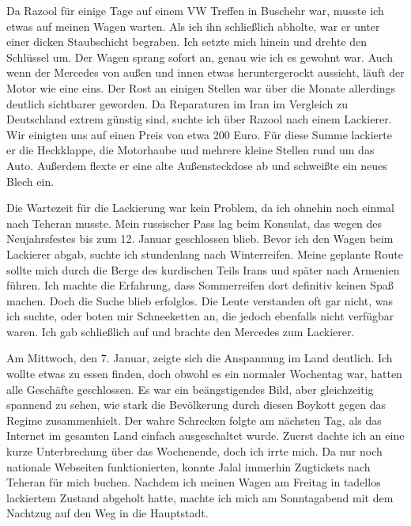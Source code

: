 Da Razool für einige Tage auf einem VW Treffen in Buschehr war, musste ich etwas auf meinen Wagen warten. Als ich ihn schließlich abholte, war er unter einer dicken Staubschicht begraben. Ich setzte mich hinein und drehte den Schlüssel um. Der Wagen sprang sofort an, genau wie ich es gewohnt war. Auch wenn der Mercedes von außen und innen etwas heruntergerockt aussieht, läuft der Motor wie eine eins. Der Rost an einigen Stellen war über die Monate allerdings deutlich sichtbarer geworden. Da Reparaturen im Iran im Vergleich zu Deutschland extrem günstig sind, suchte ich über Razool nach einem Lackierer. Wir einigten uns auf einen Preis von etwa 200 Euro. Für diese Summe lackierte er die Heckklappe, die Motorhaube und mehrere kleine Stellen rund um das Auto. Außerdem flexte er eine alte Außensteckdose ab und schweißte ein neues Blech ein.

Die Wartezeit für die Lackierung war kein Problem, da ich ohnehin noch einmal nach Teheran musste. Mein russischer Pass lag beim Konsulat, das wegen des Neujahrsfestes bis zum 12. Januar geschlossen blieb. Bevor ich den Wagen beim Lackierer abgab, suchte ich stundenlang nach Winterreifen. Meine geplante Route sollte mich durch die Berge des kurdischen Teils Irans und später nach Armenien führen. Ich machte die Erfahrung, dass Sommerreifen dort definitiv keinen Spaß machen. Doch die Suche blieb erfolglos. Die Leute verstanden oft gar nicht, was ich suchte, oder boten mir Schneeketten an, die jedoch ebenfalls nicht verfügbar waren. Ich gab schließlich auf und brachte den Mercedes zum Lackierer.

Am Mittwoch, den 7. Januar, zeigte sich die Anspannung im Land deutlich. Ich wollte etwas zu essen finden, doch obwohl es ein normaler Wochentag war, hatten alle Geschäfte geschlossen. Es war ein beängstigendes Bild, aber gleichzeitig spannend zu sehen, wie stark die Bevölkerung durch diesen Boykott gegen das Regime zusammenhielt. Der wahre Schrecken folgte am nächsten Tag, als das Internet im gesamten Land einfach ausgeschaltet wurde. Zuerst dachte ich an eine kurze Unterbrechung über das Wochenende, doch ich irrte mich. Da nur noch nationale Webseiten funktionierten, konnte Jalal immerhin Zugtickets nach Teheran für mich buchen. Nachdem ich meinen Wagen am Freitag in tadellos lackiertem Zustand abgeholt hatte, machte ich mich am Sonntagabend mit dem Nachtzug auf den Weg in die Hauptstadt.

